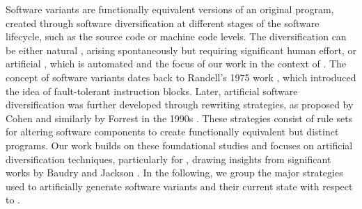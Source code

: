 Software variants are functionally equivalent versions of an original program, created through software diversification at different stages of the software lifecycle, such as the source code or machine code levels. 
The diversification can be either natural \cite{natural_diversity}, arising spontaneously but requiring significant human effort, or artificial \cite{offensive_div}, which is automated and the focus of our work in the context of \Wasm.
The concept of software variants dates back to Randell's 1975 work \cite{10.1145/390016.808467}, which introduced the idea of fault-tolerant instruction blocks. Later, artificial software diversification was further developed through rewriting strategies, as proposed by Cohen and similarly by Forrest in the 1990s \cite{cohen1993operating, 595185}. 
These strategies consist of rule sets for altering software components to create functionally equivalent but distinct programs. 
Our work builds on these foundational studies and focuses on artificial diversification techniques, particularly for \Wasm, drawing insights from significant works by Baudry \etal \cite{natural_diversity} and Jackson \etal \cite{jackson}.
In the following, we group the major strategies used to artificially generate software variants and their current state with respect to \Wasm.


